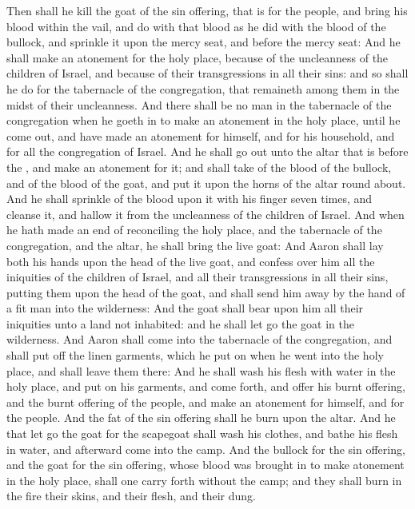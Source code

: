 \begin{biblechapter}
\verse Then shall he kill the goat of the sin offering, that is for the people, and bring his blood within the vail, and do with that blood as he did with the blood of the bullock, and sprinkle it upon the mercy seat, and before the mercy seat:
\verse And he shall make an atonement for the holy place, because of the uncleanness of the children of Israel, and because of their transgressions in all their sins: and so shall he do for the tabernacle of the congregation, that remaineth among them in the midst of their uncleanness.
\verse And there shall be no man in the tabernacle of the congregation when he goeth in to make an atonement in the holy place, until he come out, and have made an atonement for himself, and for his household, and for all the congregation of Israel.
\verse And he shall go out unto the altar that is before the \LORD, and make an atonement for it; and shall take of the blood of the bullock, and of the blood of the goat, and put it upon the horns of the altar round about.
\verse And he shall sprinkle of the blood upon it with his finger seven times, and cleanse it, and hallow it from the uncleanness of the children of Israel.
\verse And when he hath made an end of reconciling the holy place, and the tabernacle of the congregation, and the altar, he shall bring the live goat:
\verse And Aaron shall lay both his hands upon the head of the live goat, and confess over him all the iniquities of the children of Israel, and all their transgressions in all their sins, putting them upon the head of the goat, and shall send him away by the hand of a fit man into the wilderness:
\verse And the goat shall bear upon him all their iniquities unto a land not inhabited: and he shall let go the goat in the wilderness.
\verse And Aaron shall come into the tabernacle of the congregation, and shall put off the linen garments, which he put on when he went into the holy place, and shall leave them there:
\verse And he shall wash his flesh with water in the holy place, and put on his garments, and come forth, and offer his burnt offering, and the burnt offering of the people, and make an atonement for himself, and for the people.
\verse And the fat of the sin offering shall he burn upon the altar.
\verse And he that let go the goat for the scapegoat shall wash his clothes, and bathe his flesh in water, and afterward come into the camp.
\verse And the bullock for the sin offering, and the goat for the sin offering, whose blood was brought in to make atonement in the holy place, shall one carry forth without the camp; and they shall burn in the fire their skins, and their flesh, and their dung.

\end{biblechapter}
